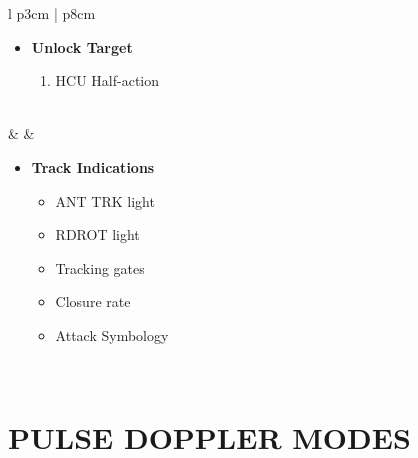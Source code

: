 \documentclass[fontHelvetica]{TechCheck}
\begin{document}
\begin{center}
\begin{longtable}{l p{3cm} | p{8cm}}
\begin{minipage}[t]{\linewidth}
\begin{itemize}
					\item \textbf{Unlock Target}
					\begin{enumerate}[label=(\alph*), resume]
						\item HCU Half-action
					\end{enumerate}
				\end{itemize}
			\end{minipage} \\
			\midrule
			\textbf{\textbullet} &  &
			\begin{minipage}[t]{\linewidth}
				\vspace{-7pt}
				\begin{itemize}
					\item \textbf{Track Indications}
					\begin{itemize}
						\item ANT TRK light
						\item RDROT light
						\item Tracking gates
						\item Closure rate
						\item Attack Symbology
					\end{itemize}
				\end{itemize}
			\end{minipage} \\
			\bottomrule
		\end{longtable}
	\end{center}

	\clearpage

	\section{PULSE DOPPLER MODES}
\end{document}
